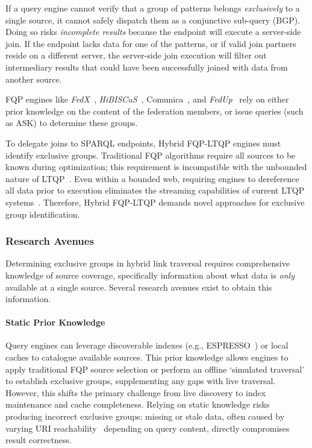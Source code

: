 \documentclass{ceurart}
\theoremstyle{definition}
\begin{document}
If a query engine cannot verify that a group of patterns belongs \emph{exclusively} to a single source,
it cannot safely dispatch them as a conjunctive sub-query (BGP).
Doing so risks \emph{incomplete results} because the endpoint will execute a server-side join.
If the endpoint lacks data for one of the patterns, or if valid join partners reside on a different server,
the server-side join execution will filter out intermediary results that could have been successfully joined with data from another source.

FQP engines like \emph{FedX}~\cite{schwarte2011fedx}, \emph{HiBISCuS}~\cite{saleem2014hibiscus},
Comunica~\cite{taelman2018comunica}, and \emph{FedUp}~\cite{aimonier2024fedup}
rely on either prior knowledge on the content of the federation members, or issue queries (such as ASK) to determine these groups.

To delegate joins to SPARQL endpoints, Hybrid FQP-LTQP engines must identify exclusive groups. 
Traditional FQP algorithms require all sources to be known during optimization;
this requirement is incompatible with the unbounded nature of LTQP~\cite{hartig2012foundations}.
Even within a bounded web, 
requiring engines to dereference all data prior to execution eliminates
the streaming capabilities of current LTQP systems~\cite{taelman2018comunica, hartig2013squin}.
Therefore, Hybrid FQP-LTQP demands novel approaches for exclusive group identification.

\subsubsection{Research Avenues}
Determining exclusive groups in hybrid link traversal requires comprehensive knowledge of source coverage, specifically information about
what data is \emph{only} available at a single source. Several research avenues exist to obtain this information.

\paragraph{Static Prior Knowledge}
Query engines can leverage discoverable indexes (e.g., ESPRESSO~\cite{ragab2023espresso}) 
or local caches to catalogue available sources.
This prior knowledge allows engines to apply traditional FQP source selection or perform an offline `simulated traversal' 
to establish exclusive groups, supplementing any gaps with live traversal.
However, this shifts the primary challenge from live discovery to index maintenance and cache completeness.
Relying on static knowledge risks producing incorrect exclusive groups;
missing or stale data, often caused by varying URI reachability~\cite{hartig2012foundations}
depending on query content, directly compromises result correctness.
\end{document}
